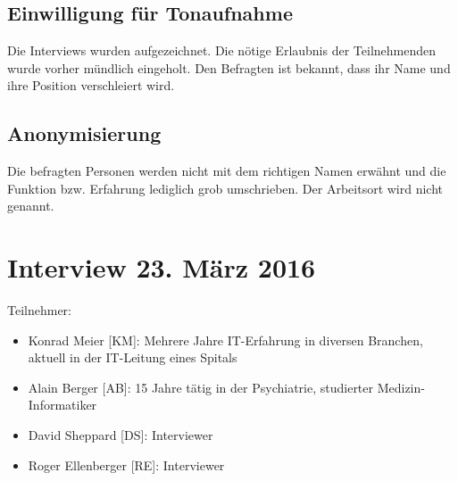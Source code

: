 \documentclass[a4paper]{scrartcl}
\begin{document}
\subsection{Einwilligung für Tonaufnahme}
Die Interviews wurden aufgezeichnet. Die nötige Erlaubnis der Teilnehmenden wurde vorher mündlich eingeholt. Den Befragten ist bekannt, dass ihr Name und ihre Position verschleiert wird.


\subsection{Anonymisierung}
Die befragten Personen werden nicht mit dem richtigen Namen erwähnt und die Funktion bzw. Erfahrung lediglich grob umschrieben. Der Arbeitsort wird nicht genannt.


\section{Interview 23. März 2016}
Teilnehmer:
\begin{itemize}
\item Konrad Meier [KM]: Mehrere Jahre IT-Erfahrung in diversen Branchen, aktuell in der IT-Leitung eines Spitals
\item Alain Berger [AB]: 15 Jahre tätig in der Psychiatrie, studierter Medizin-Informatiker
\item David Sheppard [DS]: Interviewer
\item Roger Ellenberger [RE]: Interviewer
\end{itemize}
\end{document}
